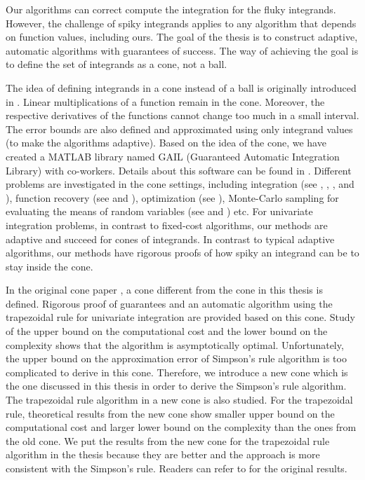 \documentclass{iitthesis}
\theoremstyle{definition}
\theoremstyle{remark}
\begin{document}
Our algorithms can correct compute the integration for the fluky integrands. However, the challenge of spiky integrands applies to any algorithm that depends on function values, including ours. The goal of the thesis is to construct adaptive, automatic algorithms with guarantees of success. The way of achieving the goal is to define the set of integrands as a cone, not a ball. 

The idea of defining integrands in a cone instead of a ball is originally introduced in \cite{HicEtal14b}. Linear multiplications of a function remain in the cone. Moreover, the respective derivatives of the functions cannot change too much in a small interval. The error bounds are also defined and approximated using only integrand values (to make the algorithms adaptive). Based on the idea of the cone, we have created a MATLAB library named GAIL (Guaranteed Automatic Integration Library)\cite{ChoEtal17b} with co-workers. Details about this software can be found in \cite{Gail_ug}. Different problems are investigated in the cone settings, including integration (see \cite{HicJim16a}, \cite{HicRazYun15a}, \cite{Lu118a}, and \cite{JimHic16a}), function recovery (see \cite{DinHicWoz17a} and \cite{ChoEtal17a}), optimization (see \cite{ChoEtal17a}), Monte-Carlo sampling for evaluating the means of random variables (see \cite{HicEtal14a} and \cite{JiaHic16a}) etc. For univariate integration problems, in contrast to fixed-cost algorithms, our methods are adaptive and succeed for cones of integrands. In contrast to typical adaptive algorithms, our methods have rigorous proofs of how spiky an integrand can be to stay inside the cone.

In the original cone paper \cite{HicEtal14b}, a cone different from the cone in this thesis is defined. Rigorous proof of guarantees and an automatic algorithm using the trapezoidal rule for univariate integration are provided based on this cone. Study of the upper bound on the computational cost and the lower bound on the complexity shows that the algorithm is asymptotically optimal. Unfortunately, the upper bound on the approximation error of Simpson's rule algorithm is too complicated to derive in this cone. Therefore, we introduce a new cone which is the one discussed in this thesis in order to derive the Simpson's rule algorithm. The trapezoidal rule algorithm in a new cone is also studied. For the trapezoidal rule, theoretical results from the new cone show smaller upper bound on the computational cost and larger lower bound on the complexity than the ones from the old cone. We put the results from the new cone for the trapezoidal rule algorithm in the thesis because they are better and the approach is more consistent with the Simpson's rule. Readers can refer to \cite[Algo 4, Thm 7, Thm 8]{HicEtal14b} for the original results.
\end{document}
